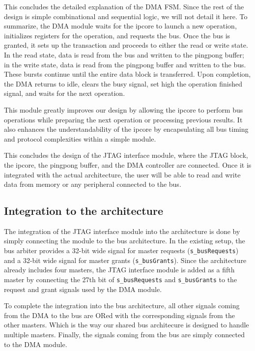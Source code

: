 \documentclass[a4paper,11pt,oneside]{report}
\begin{document}
This concludes the detailed explanation of the DMA FSM.  
Since the rest of the design is simple combinational and sequential logic, we will not detail it here.  
To summarize, the DMA module waits for the ipcore to launch a new operation, initializes registers for the operation, and requests the bus.  
Once the bus is granted, it sets up the transaction and proceeds to either the read or write state.  
In the read state, data is read from the bus and written to the pingpong buffer;  
in the write state, data is read from the pingpong buffer and written to the bus.  
These bursts continue until the entire data block is transferred.  
Upon completion, the DMA returns to idle, clears the busy signal, set high the operation finished signal, and waits for the next operation.

This module greatly improves our design by allowing the ipcore to perform bus operations while preparing the next operation or processing previous results.  
It also enhances the understandability of the ipcore by encapsulating all bus timing and protocol complexities within a simple module.

This concludes the design of the JTAG interface module,  
where the JTAG block, the ipcore, the pingpong buffer, and the DMA controller are connected.  
Once it is integrated with the actual architecture, the user will be able to read and write data from memory or any peripheral connected to the bus.

\subsection{Integration to the architecture}

The integration of the JTAG interface module into the architecture is done by simply connecting the module to the bus architecture.  
In the existing setup, the bus arbiter provides a 32-bit wide signal for master requests (\texttt{s\_busRequests}) and a 32-bit wide signal for master grants (\texttt{s\_busGrants}).  
Since the architecture already includes four masters, the JTAG interface module is added as a fifth master by connecting the 27th bit of \texttt{s\_busRequests} and \texttt{s\_busGrants}  
to the request and grant signals used by the DMA module.  

To complete the integration into the bus architecture, all other signals coming from the DMA to the bus are ORed with the corresponding signals from the other masters.  
Which is the way our shared bus architecure is designed to handle multiple masters.
Finally, the signals coming from the bus are simply connected to the DMA module.
\end{document}
